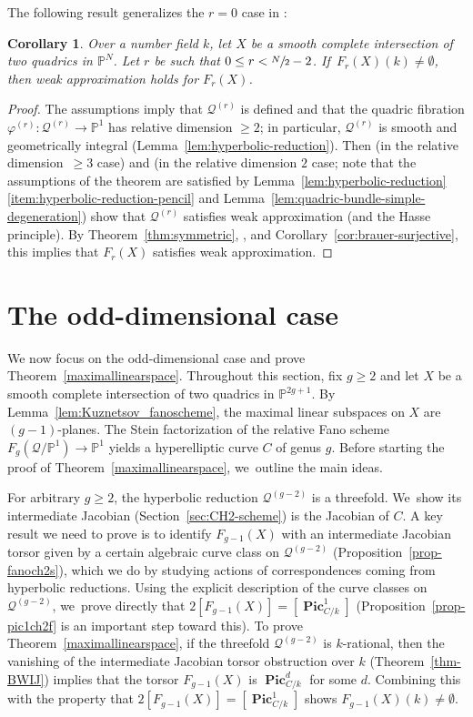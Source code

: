 \documentclass[JEP,XML,SOM,Unicode,NoEqCountersInSection,published]{cedram}
\let\cal\mathcal
\let\bb\mathbb\let\Bbb\mathbb
\theoremstyle{plain}
\newtheorem{cor}[thm]{Corollary}
\theoremstyle{definition}
\DeclareMathOperator{\bPic}{\mathbf{Pic}}
\let\phi\varphi
\renewcommand\P{\mathbb{P}}
\begin{document}
The following result generalizes the \(r=0\) case in \cite[Th.\,A(ii)]{CTSSD}:

\begin{cor}\label{cor:weak-approximation-fano}
Over a number field $k$, let $X$ be a smooth complete intersection of two quadrics in $\P^N$. Let $r$ be such that $0\leq r<\sfrac{N}{2}-2$. If~\(F_r(X)(k)\neq\emptyset\), then weak approximation holds for \(F_r(X)\).
\end{cor}
\begin{proof}
The assumptions imply that \(\cal Q^{(r)}\) is defined and that the quadric fibration \(\phi^{(r)}\colon \cal Q^{(r)}\to\bb P^1\) has relative dimension \(\geq 2\); in particular, \(\cal Q^{(r)}\) is smooth and geometrically integral (Lemma~\ref{lem:hyperbolic-reduction}).
Then \cite[Prop.\,3.9]{CTSSD} (in the relative dimension~\(\geq 3\) case) and \cite[Th.\,3.10]{CTSSD} (in the relative dimension \(2\) case; note that the assumptions of the theorem are satisfied by Lemma~\ref{lem:hyperbolic-reduction}\eqref{item:hyperbolic-reduction-pencil}
and Lemma~\ref{lem:quadric-bundle-simple-degeneration})
show that \(\cal Q^{(r)}\) satisfies weak approximation (and the Hasse principle).
By Theorem~\ref{thm:symmetric}, \cite[Th.\,1.3]{ChenZhang23}, and Corollary~\ref{cor:brauer-surjective}, this implies that \(F_r(X)\) satisfies weak approximation.
\end{proof}

\section{The odd-dimensional case
}\label{section-maximal}
We now focus on the odd-dimensional case and prove Theorem~\ref{maximallinearspace}.
Throughout this section,
fix $g\geq 2$ and let $X$ be a smooth complete intersection of two quadrics in $\P^{2g+1}$.
By Lemma~\ref{lem:Kuznetsov_fanoscheme}, the maximal linear subspaces on \(X\) are \((g-1)\)-planes. The Stein factorization of the relative Fano scheme $F_{g}(\mathcal{Q}/\P^1)\to \P^1$ yields a hyperelliptic curve $C$ of genus $g$.
Before starting the proof of Theorem~\ref{maximallinearspace}, we~outline the main ideas.

For arbitrary \(g \geq 2\), the hyperbolic reduction \(\cal Q^{(g-2)}\) is a threefold. We~show its intermediate Jacobian (Section~\ref{sec:CH2-scheme}) is the Jacobian of \(C\). A key result we need to prove is to identify \(F_{g-1}(X)\) with an intermediate Jacobian torsor given by a certain algebraic curve class on \(\cal Q^{(g-2)}\) (Proposition~\ref{prop-fanoch2s}), which we do by studying actions of correspondences coming from hyperbolic reductions. Using the explicit description of the curve classes on \(\cal Q^{(g-2)}\), we~prove directly that \(2[F_{g-1}(X)]=[\bPic^1_{C/k}]\) (Proposition~\ref{prop-pic1ch2f} is an important step toward this).
To prove Theorem~\ref{maximallinearspace},
if the threefold \(\cal Q^{(g-2)}\) is \(k\)-rational, then the vanishing of the intermediate Jacobian torsor obstruction over \(k\) (Theorem~\ref{thm-BWIJ}) implies that the torsor \(F_{g-1}(X)\) is \(\bPic^d_{C/k}\) for some \(d\). Combining this with the property that \(2[F_{g-1}(X)]=[\bPic^1_{C/k}]\) shows \(F_{g-1}(X)(k)\neq\emptyset\).
\end{document}
